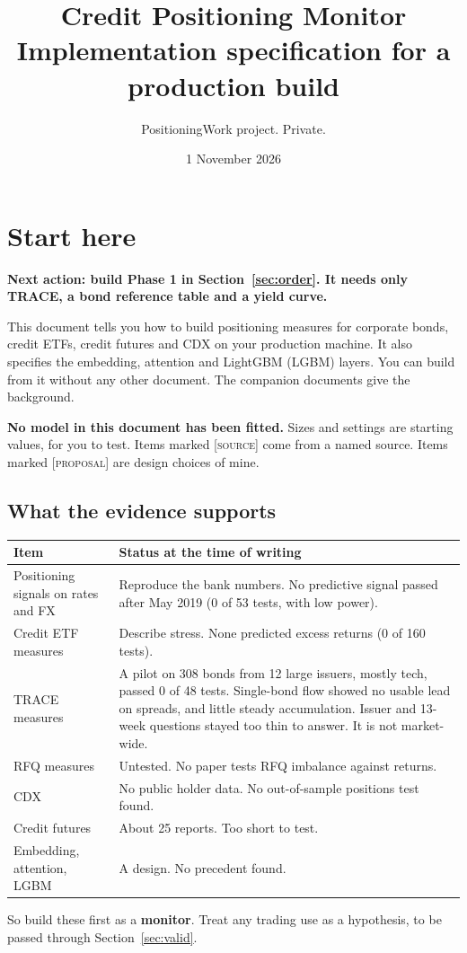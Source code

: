 \documentclass[11pt]{article}
\title{Credit Positioning Monitor\\ \large Implementation specification for a production build}
\author{PositioningWork project. Private.}
\date{1 November 2026}
\newcommand{\stated}{\textsc{[source]}}
\newcommand{\proposal}{\textsc{[proposal]}}
\begin{document}
\maketitle
\tableofcontents
\newpage

\section*{Start here}
\textbf{Next action: build Phase 1 in Section~\ref{sec:order}. It needs only TRACE, a bond reference table and a yield curve.}

This document tells you how to build positioning measures for corporate bonds, credit ETFs, credit futures and CDX on your production machine. It also specifies the embedding, attention and LightGBM (LGBM) layers. You can build from it without any other document. The companion documents give the background.

\textbf{No model in this document has been fitted.} Sizes and settings are starting values, for you to test. Items marked \stated{} come from a named source. Items marked \proposal{} are design choices of mine.

\subsection*{What the evidence supports}
\begin{center}\small
\begin{tabularx}{\linewidth}{@{}lL@{}}
\toprule
Item & Status at the time of writing \\
\midrule
Positioning signals on rates and FX & Reproduce the bank numbers. No predictive signal passed after May 2019 (0 of 53 tests, with low power). \\
Credit ETF measures & Describe stress. None predicted excess returns (0 of 160 tests). \\
TRACE measures & A pilot on 308 bonds from 12 large issuers, mostly tech, passed 0 of 48 tests. Single-bond flow showed no usable lead on spreads, and little steady accumulation. Issuer and 13-week questions stayed too thin to answer. It is not market-wide. \\
RFQ measures & Untested. No paper tests RFQ imbalance against returns. \\
CDX & No public holder data. No out-of-sample positions test found. \\
Credit futures & About 25 reports. Too short to test. \\
Embedding, attention, LGBM & A design. No precedent found. \\
\bottomrule
\end{tabularx}
\end{center}
So build these first as a \textbf{monitor}. Treat any trading use as a hypothesis, to be passed through Section~\ref{sec:valid}.
\end{document}
